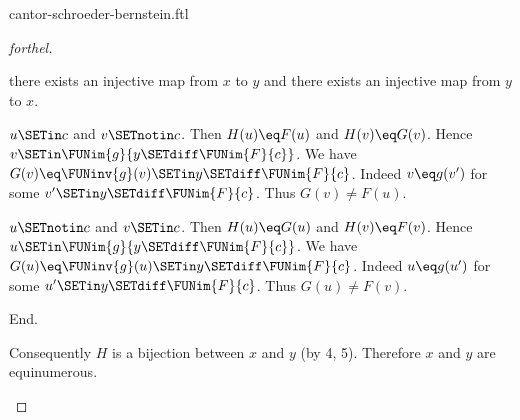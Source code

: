\documentclass{stex}
\begin{document}
\begin{smodule}{cantor-schroeder-bernstein.ftl}
\begin{proof}[forthel]
\begin{case}{there exists an injective map from $x$ to $y$ and there exists an injective map from $y$ to $x$.}
      \begin{case}{$u \SETin c$ and $v \SETnotin c$.}
        Then $H(u) \eq F(u)$ and $H(v) \eq G(v)$.
        Hence $v \SETin \FUNim{g}{y \SETdiff \FUNim{F}{c}}$.
        We have $G(v) \eq \FUNinv{g}(v) \SETin y \SETdiff \FUNim{F}{c}$.
        Indeed $v \eq g(v')$ for some $v' \SETin y \SETdiff \FUNim{F}{c}$.
        Thus $G(v) \neq F(u)$.
      \end{case}

      \begin{case}{$u \SETnotin c$ and $v \SETin c$.}
        Then $H(u) \eq G(u)$ and $H(v) \eq F(v)$.
        Hence $u \SETin \FUNim{g}{y \SETdiff \FUNim{F}{c}}$.
        We have $G(u) \eq \FUNinv{g}(u) \SETin y \SETdiff \FUNim{F}{c}$.
        Indeed $u \eq g(u')$ for some $u' \SETin y \SETdiff \FUNim{F}{c}$.
        Thus $G(u) \neq F(v)$.
      \end{case}
    End.

    Consequently $H$ is a bijection between $x$ and $y$ (by 4, 5).
    Therefore $x$ and $y$ are equinumerous.
  \end{case}
\end{proof}

\printbibliography
{}
\end{smodule}
\end{document}

